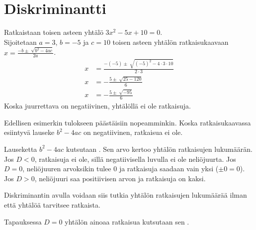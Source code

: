 \section{Diskriminantti}


\begin{esimerkki}
    Ratkaistaan toisen asteen yhtälö $3x^2-5x+10=0$.\\
    
    Sijoitetaan $a=3$, $b=-5$ ja $c=10$ toisen asteen yhtälön ratkaisukaavaan $x=\frac{-b \pm \sqrt[]{b^2-4ac}}{2a}$.
    \begin{align*}
        x &=\frac{-(-5) \pm \sqrt[]{(-5)^2-4\cdot 3 \cdot 10}}{2 \cdot 3} \\
        x &=-\frac{5 \pm \sqrt[]{25-120}}{6} \\
          x &=-\frac{5 \pm \sqrt[]{-95}}{6} 
    \end{align*}
    Koska juurrettava on negatiivinen,
	 yhtälöllä ei ole ratkaisuja.
\end{esimerkki}

Edellisen esimerkin tulokseen päästäisiin nopeamminkin.
Koska ratkaisukaavassa esiintyvä lauseke $b^2-4ac$ on negatiivinen,
ratkaisua ei ole.

Lauseketta $b^2-4ac$ kutsutaan . Sen arvo kertoo yhtälön ratkaisujen lukumäärän. Jos $D<0$, ratkaisuja ei ole, sillä negatiivisella luvulla ei ole neliöjuurta. Jos $D=0$, neliöjuuren arvoksikin tulee $0$ ja ratkaisuja saadaan vain yksi ($\pm 0 = 0$).
Jos $D>0$, neliöjuuri saa positiivisen arvon ja ratkaisuja on kaksi.

Diskriminantin avulla voidaan siis tutkia yhtälön ratkaisujen lukumäärää ilman että
yhtälöä tarvitsee ratkaista.

\newpage
{}
Tapauksessa $D=0$ yhtälön ainoaa ratkaisua kutsutaan
sen .

